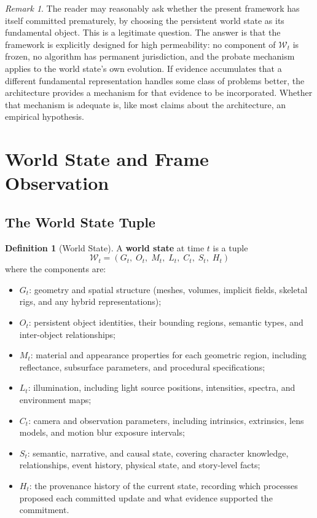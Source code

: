 \documentclass[11pt,a4paper]{article}
\theoremstyle{plain}
\theoremstyle{definition}
\newtheorem{definition}[theorem]{Definition}
\theoremstyle{remark}
\newtheorem{remark}[theorem]{Remark}
\begin{document}
\begin{remark}
The reader may reasonably ask whether the present framework has itself committed prematurely, by choosing the persistent world state as its fundamental object. This is a legitimate question. The answer is that the framework is explicitly designed for high permeability: no component of $\mathcal{W}_t$ is frozen, no algorithm has permanent jurisdiction, and the probate mechanism applies to the world state's own evolution. If evidence accumulates that a different fundamental representation handles some class of problems better, the architecture provides a mechanism for that evidence to be incorporated. Whether that mechanism is adequate is, like most claims about the architecture, an empirical hypothesis.
\end{remark}

\section{World State and Frame Observation}
\label{sec:worldstate}

\subsection{The World State Tuple}

\begin{definition}[World State]
A \textbf{world state} at time $t$ is a tuple
\[
\mathcal{W}_t = (G_t,\; O_t,\; M_t,\; L_t,\; C_t,\; S_t,\; H_t)
\]
where the components are:
\begin{itemize}[leftmargin=2em,itemsep=0pt]
\item $G_t$: geometry and spatial structure (meshes, volumes, implicit fields, skeletal rigs, and any hybrid representations);
\item $O_t$: persistent object identities, their bounding regions, semantic types, and inter-object relationships;
\item $M_t$: material and appearance properties for each geometric region, including reflectance, subsurface parameters, and procedural specifications;
\item $L_t$: illumination, including light source positions, intensities, spectra, and environment maps;
\item $C_t$: camera and observation parameters, including intrinsics, extrinsics, lens models, and motion blur exposure intervals;
\item $S_t$: semantic, narrative, and causal state, covering character knowledge, relationships, event history, physical state, and story-level facts;
\item $H_t$: the provenance history of the current state, recording which processes proposed each committed update and what evidence supported the commitment.
\end{itemize}
\end{definition}
\end{document}
